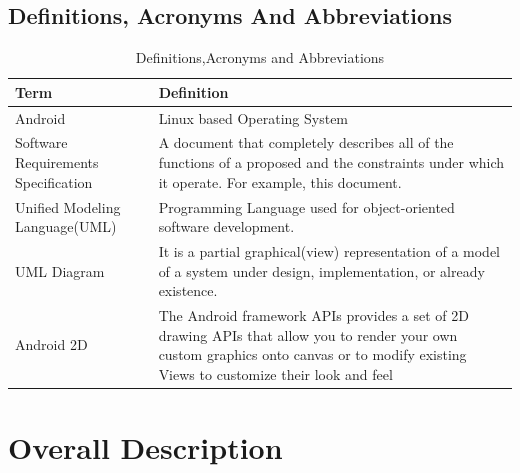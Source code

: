 \documentclass[12pt]{report}
\begin{document}
\section{Definitions, Acronyms And Abbreviations }
\begin{table}[H]
\begin{tabularx}{\linewidth}{|X|X|}
\hline
Term                                & Definition                                                                                                                                                                        \\ \hline
Android                             & Linux based Operating System                                                                                                                                                      \\ \hline
Software Requirements Specification & A document that completely describes all of the functions of a proposed and the constraints under which it operate. For example, this document.                                             \\ \hline
Unified Modeling Language(UML)      & Programming Language used for object-oriented software development.                                                                                                                      \\ \hline
UML Diagram                         & It is a partial graphical(view) representation of a model of a system under design, implementation, or already existence.                                                                             \\ \hline
Android 2D                          & The Android framework APIs provides a set of 2D drawing APIs that allow you to render your own custom graphics onto canvas or to modify existing Views to customize their look and feel \\ \hline
\end{tabularx}
\caption{Definitions,Acronyms and Abbreviations\label{fig:definitions_abbreviations}}
\end{table}

\chapter{Overall Description}
\end{document}
